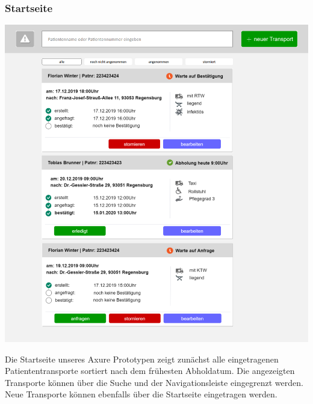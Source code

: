 \documentclass[a4paper, ngerman, 12pt]{scrartcl}
\begin{document}
\subsubsection{Startseite}
\begin{center}
\begin{minipage}{0.8\textwidth}
	\centering
	\includegraphics[width=\textwidth]{Bilder/ap1Startseite.png}
	\label{img:ap1start}
\end{minipage}
\end{center}
Die Startseite unseres Axure Prototypen zeigt zunächst alle eingetragenen Patiententransporte sortiert nach dem frühesten Abholdatum. Die angezeigten Transporte können über die Suche und der Navigationsleiste eingegrenzt werden. Neue Transporte können ebenfalls über die Startseite eingetragen werden.
\end{document}
